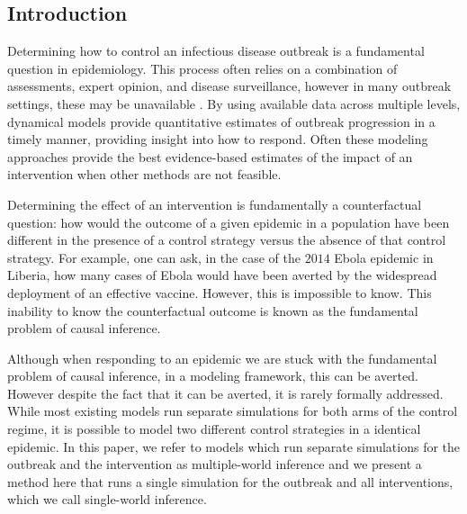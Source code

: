 \documentclass[PTRSB]{rsos}
\begin{document}
\begin{multicols}{2}
\section{Introduction}
Determining how to control an infectious disease outbreak is a fundamental question in epidemiology.
This process often relies on a combination of assessments, expert opinion, and disease surveillance, however in many outbreak settings, these may be unavailable \cite{daughton-et-al:2017}.
By using available data across multiple levels, dynamical models provide quantitative estimates of outbreak progression in a timely manner, providing insight into how to respond.
Often these modeling approaches provide the best evidence-based estimates of the impact of an intervention when other methods are not feasible.

Determining the effect of an intervention is fundamentally a counterfactual question: how would the outcome of a given epidemic in a population have been different in the presence of a control strategy versus the absence of that control strategy.
For example, one can ask, in the case of the $2014$ Ebola epidemic in Liberia, how many cases of Ebola would have been averted by the widespread deployment of an effective vaccine.
However, this is impossible to know. 
This inability to know the counterfactual outcome is known as the fundamental problem of causal inference.\cite{holland:1986}

Although when responding to an epidemic we are stuck with the fundamental problem of causal inference, in a modeling framework, this can be averted.
However despite the fact that it can be averted, it is rarely formally addressed. 
While most existing models run separate simulations for both arms of the control regime, it is possible to model two different control strategies in a identical epidemic.
In this paper, we refer to models which run separate simulations for the outbreak and the intervention as multiple-world inference and we present a method here that runs a single simulation for the outbreak and all interventions, which we call single-world inference.


\end{multicols}
\end{document}
